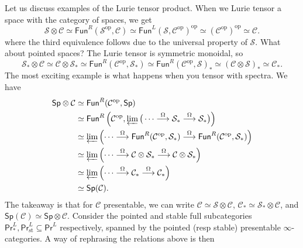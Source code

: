 \begin{example}
    Let us discuss examples of the Lurie tensor product. When we Lurie tensor a space with the category of spaces, we get 
    \[
        \mathcal{S} \otimes \mathcal{C}   \simeq \mathsf{Fun} ^R(\mathcal{S} ^{\mathrm{op}},\mathcal{C} )\simeq \mathsf{Fun} ^L(\mathcal{S} ,\mathcal{C} ^{\mathrm{op}})^{\mathrm{op}}\simeq (\mathcal{C} ^{\mathrm{op}})^{\mathrm{op}}\simeq  \mathcal{C} .
    \] where the third equivalence follows due to the universal property of $\mathcal{S} $. What about pointed spaces? The Lurie tensor is symmetric monoidal, so \[
    \mathcal{S} _* \otimes \mathcal{C} \simeq \mathcal{C} \otimes \mathcal{S} _*\simeq  \mathsf{Fun} ^R(\mathcal{C} ^{\mathrm{op}},\mathcal{S} _*) \simeq \mathsf{Fun} ^R(\mathcal{C} ^{\mathrm{op}},\mathcal{S} )_* \simeq (\mathcal{C} \otimes \mathcal{S} )_* \simeq \mathcal{C} _*.
    \] The most exciting example is what happens when you tensor with spectra. We have 
    \begin{align*}
        \mathsf{Sp} \otimes \mathcal{C} & \simeq \mathsf{Fun} ^R(\mathcal{C} ^{\mathrm{op}},\mathsf{Sp} )\\
                                        &\simeq \mathsf{Fun} ^R\left( \mathcal{C} ^{\mathrm{op}},\varprojlim \big( \cdots \overset{\Omega}{\longrightarrow} \mathcal{S} _*\overset{\Omega}{\longrightarrow} \mathcal{S} _*\big)\right) \\
                                        &\simeq \varprojlim \left( \cdots \overset{\Omega}{\longrightarrow} \mathsf{Fun} ^R(\mathcal{C} ^{\mathrm{op}},\mathcal{S} _*) \overset{\Omega}{\longrightarrow} \mathsf{Fun} ^R(\mathcal{C} ^{\mathrm{op}},\mathcal{S} _*)\right) \\
                                        &\simeq  \varprojlim \left( \cdots \overset{\Omega}{\longrightarrow} \mathcal{C} \otimes \mathcal{S} _*\overset{\Omega}{\longrightarrow} \mathcal{C} \otimes \mathcal{S} _* \right) \\
                                        &\simeq \varprojlim \left( \cdots \overset{\Omega}{\longrightarrow} \mathcal{C} _* \overset{\Omega}{\longrightarrow} \mathcal{C} _*\right) \\
                                        &\simeq  \mathsf{Sp} (\mathcal{C} ).
    \end{align*}
    The takeaway is that for $\mathcal{C} $ presentable, we can write $\mathcal{C} \simeq  \mathcal{S} \otimes \mathcal{C}  $, $\mathcal{C} _* \simeq  \mathcal{S} _* \otimes \mathcal{C} $, and $\mathsf{Sp} (\mathcal{C} ) \simeq \mathsf{Sp} \otimes \mathcal{C} $. Consider the pointed and stable full subcategories $\mathsf{Pr} _*^L,\mathsf{Pr} _{\mathrm{st}}^L \subseteq \mathsf{Pr} ^L$ respectively, spanned by the pointed (resp stable) presentable $\infty$-categories. A way of rephrasing the relations above is then 

\end{example}
